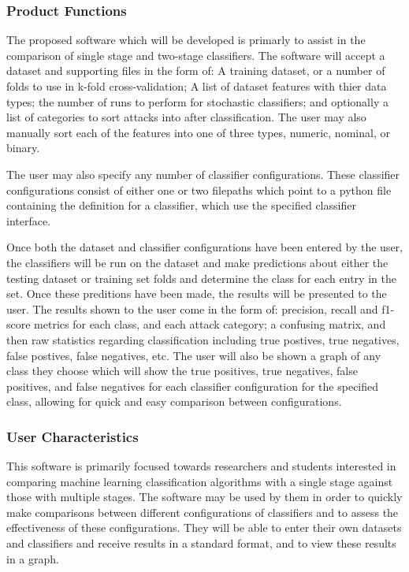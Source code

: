 \documentclass[12pt,a4paper]{article}
\begin{document}
\subsubsection{Product Functions}
The proposed software which will be developed is primarly to assist in the comparison of single stage and two-stage classifiers. The software will accept a dataset and supporting files in the form of: A training dataset, or a number of folds to use in k-fold cross-validation; A list of dataset features with thier data types; the number of runs to perform for stochastic classifiers; and optionally a list of categories to sort attacks into after classification. The user may also manually sort each of the features into one of three types, numeric, nominal, or binary. 

The user may also specify any number of classifier configurations. These classifier configurations consist of either one or two filepaths which point to a python file containing the definition for a classifier, which use the specified classifier interface. 

Once both the dataset and classifier configurations have been entered by the user, the classifiers will be run on the dataset and make predictions about either the testing dataset or training set folds and determine the class for each entry in the set. Once these preditions have been made, the results will be presented to the user. The results shown to the user come in the form of: precision, recall and f1-score metrics for each class, and each attack category; a confusing matrix, and then raw statistics regarding classification including true postives, true negatives, false postives, false negatives, etc. The user will also be shown a graph of any class they choose which will show the true positives, true negatives, false positives, and false negatives for each classifier configuration for the specified class, allowing for quick and easy comparison between configurations.


\subsubsection{User Characteristics}
This software is primarily focused towards researchers and students interested in comparing machine learning classification algorithms with a single stage against those with multiple stages. The software may be used by them in order to quickly make comparisons between different configurations of classifiers and to assess the effectiveness of these configurations. They will be able to enter their own datasets and classifiers and receive results in a standard format, and to view these results in a graph.
\end{document}
